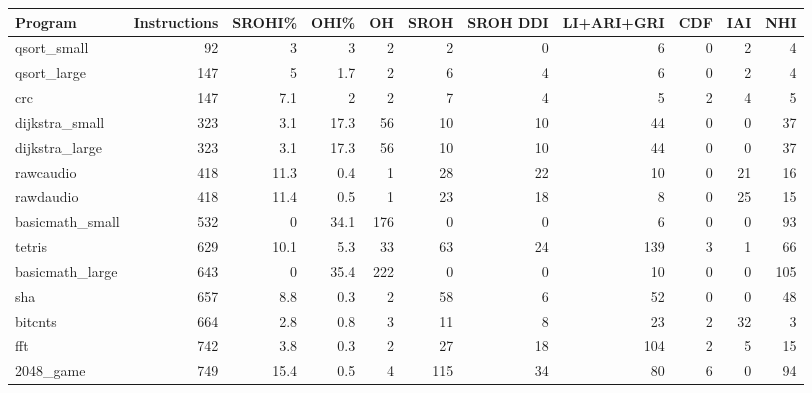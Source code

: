 \begin{tabular}{|l|r|r|r|r|r|r|r|r|r|r|}
\hline
 Program         &   Instructions &   SROHI\% &   OHI\% &   OH &   SROH &   SROH DDI &   LI+ARI+GRI &   CDF &   IAI &   NHI \\
\hline
 qsort\_small     &             92 &      3   &    3   &    2 &      2 &          0 &            6 &     0 &     2 &     4 \\
\hline
 qsort\_large     &            147 &      5   &    1.7 &    2 &      6 &          4 &            6 &     0 &     2 &     4 \\
\hline
 crc             &            147 &      7.1 &    2   &    2 &      7 &          4 &            5 &     2 &     4 &     5 \\
\hline
 dijkstra\_small  &            323 &      3.1 &   17.3 &   56 &     10 &         10 &           44 &     0 &     0 &    37 \\
\hline
 dijkstra\_large  &            323 &      3.1 &   17.3 &   56 &     10 &         10 &           44 &     0 &     0 &    37 \\
\hline
 rawcaudio       &            418 &     11.3 &    0.4 &    1 &     28 &         22 &           10 &     0 &    21 &    16 \\
\hline
 rawdaudio       &            418 &     11.4 &    0.5 &    1 &     23 &         18 &            8 &     0 &    25 &    15 \\
\hline
 basicmath\_small &            532 &      0   &   34.1 &  176 &      0 &          0 &            6 &     0 &     0 &    93 \\
\hline
 tetris          &            629 &     10.1 &    5.3 &   33 &     63 &         24 &          139 &     3 &     1 &    66 \\
\hline
 basicmath\_large &            643 &      0   &   35.4 &  222 &      0 &          0 &           10 &     0 &     0 &   105 \\
\hline
 sha             &            657 &      8.8 &    0.3 &    2 &     58 &          6 &           52 &     0 &     0 &    48 \\
\hline
 bitcnts         &            664 &      2.8 &    0.8 &    3 &     11 &          8 &           23 &     2 &    32 &     3 \\
\hline
 fft             &            742 &      3.8 &    0.3 &    2 &     27 &         18 &          104 &     2 &     5 &    15 \\
\hline
 2048\_game       &            749 &     15.4 &    0.5 &    4 &    115 &         34 &           80 &     6 &     0 &    94 \\

\end{tabular}
